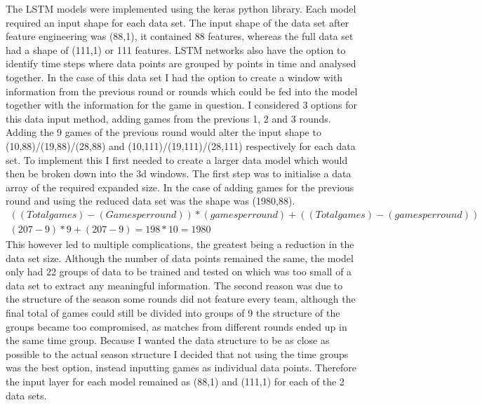 \documentclass{imc-inf}
\begin{document}
	The LSTM models were implemented using the keras python library. 
	Each model required an input shape for each data set. The input shape of the data set after feature engineering was (88,1), it contained 88 features, whereas the full data set had a shape of (111,1) or 111 features. LSTM networks also have the option to identify time steps where data points are grouped by points in time and analysed together. In the case of this data set I had the option to create a window with information from the previous round or rounds which could be fed into the model together with the information for the game in question. I considered 3 options for this data input method, adding games from the previous 1, 2 and 3 rounds. Adding the 9 games of the previous round would alter the input shape to (10,88)/(19,88)/(28,88) and (10,111)/(19,111)/(28,111) respectively for each data set. To implement this I first needed to create a larger data model which would then be broken down into the 3d windows. The first step was to initialise a data array of the required expanded size. In the case of adding games for the previous round and using the reduced data set was the shape was (1980,88).
	\begin{equation}
		\begin{array}{l}
			((Total games) - (Games per round )) * (games per round) + ((Total games) - (games per round)) \\
			(207 - 9) * 9 + (207 - 9) = 198 * 10 = 1980
		\end{array}
	\end{equation}
	This however led to multiple complications, the greatest being a reduction in the data set size. Although the number of data points remained the same, the model only had 22 groups of data to be trained and tested on which was too small of a data set to extract any meaningful information. The second reason was due to the structure of the season some rounds did not feature every team, although the final total of games could still be divided into groups of 9 the structure of the groups became too compromised, as matches from different rounds ended up in the same time group. Because I wanted the data structure to be as close as possible to the actual season structure I decided that not using the time groups was the best option, instead inputting games as individual data points. Therefore the input layer for each model remained as (88,1) and (111,1) for each of the 2 data sets.
	\newline 
	
\end{document}
